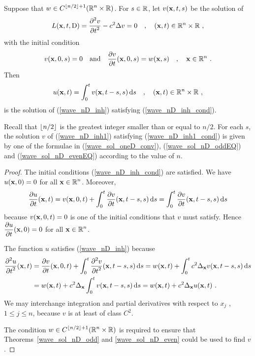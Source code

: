 \begin{theorem}
Suppose that $\displaystyle w\in C^{\lfloor{n/2}\rfloor+1}(\mathbb{R}^n\times \mathbb{R})$.
For $s\in \mathbb{R}$, let $v(\mathbf{x},t,s)$ be the solution of
\begin{equation} \label{wave_nD_inh1}
L(\mathbf{x},t,\operatorname{D}) = \frac{\displaystyle \partial^{2}{v}} {\displaystyle \partial t^{2}} - c^2 \Delta v = 0 \quad ,
\quad (\mathbf{x},t) \in \mathbb{R}^n \times \mathbb{R} \ ,
\end{equation}
with the initial condition
\begin{equation} \label{wave_nD_inh1_cond}
v(\mathbf{x}, 0, s) = 0 \quad \text{and} \quad
\frac{\partial{v}}{\partial t}(\mathbf{x},0,s) = w(\mathbf{x},s) \quad , \quad
\mathbf{x} \in \mathbb{R}^n \ .
\end{equation}
Then
\[
u(\mathbf{x},t) = \int_0^t v(\mathbf{x},t-s,s)\,\mathrm{d}{s} \quad , \quad
(\mathbf{x},t) \in \mathbb{R}^n \times \mathbb{R} \ ,
\]
is the solution of (\ref{wave_nD_inh}) satisfying
(\ref{wave_nD_inh_cond}).
\end{theorem}

\begin{rmk}
Recall that $\lfloor{n/2}\rfloor$ is the greatest integer smaller than
or equal to $n/2$.  For each $s$, the solution $v$ of (\ref{wave_nD_inh1})
satisfying (\ref{wave_nD_inh1_cond}) is given by one of the formulae
in (\ref{wave_sol_oneD_conv}), (\ref{wave_sol_nD_oddEQ}) and
(\ref{wave_sol_nD_evenEQ}) according to the value of $n$.
\end{rmk}

\begin{proof}
The initial conditions (\ref{wave_nD_inh_cond}) are satisfied.  We
have $u(\mathbf{x},0) = 0$ for all $\displaystyle \mathbf{x} \in \mathbb{R}^n$.  Moreover,
\[
\frac{\partial{u}}{\partial t}(\mathbf{x},t) = v(\mathbf{x}, 0, t) +
\int_0^t \frac{\partial{v}}{\partial t}(\mathbf{x}, t-s,s)\,\mathrm{d}{s} =
\int_0^t \frac{\partial{v}}{\partial t}(\mathbf{x}, t-s,s)\,\mathrm{d}{s}
\]
because $v(\mathbf{x},0,t) = 0$ is one of the initial conditions that $v$
must satisfy.  Hence $\displaystyle \frac{\partial{u}}{\partial t}(\mathbf{x},0) = 0$
for all $\displaystyle \mathbf{x} \in \mathbb{R}^n$.

The function $u$ satisfies (\ref{wave_nD_inh}) because
\begin{align*}
\frac{\displaystyle \partial^{2}{u}} {\displaystyle \partial t^{2}}(\mathbf{x},t) &= \frac{\partial{v}}{\partial t}(\mathbf{x}, 0, t)
+ \int_0^t \frac{\displaystyle \partial^{2}{v}} {\displaystyle \partial t^{2}}(\mathbf{x}, t-s, s) \,\mathrm{d}{s}
= w(\mathbf{x},t) + \int_0^t c^2 \Delta_{\mathbf{x}} v(\mathbf{x},t-s,s) \,\mathrm{d}{s} \\
&= w(\mathbf{x},t) + c^2 \Delta_{\mathbf{x}} \int_0^t v(\mathbf{x},t-s,s) \,\mathrm{d}{s}
=  w(\mathbf{x},t) + c^2 \Delta_{\mathbf{x}} u(\mathbf{x},t) \  .
\end{align*}
We may interchange integration and partial derivatives with respect to
$x_j$ , $1\leq j \leq n$, because $v$ is at least of class $\displaystyle C^2$.

The condition $\displaystyle w\in C^{\lfloor{n/2}\rfloor+1}(\mathbb{R}^n\times \mathbb{R})$
is required to ensure that Theorems~\ref{wave_sol_nD_odd}
and \ref{wave_sol_nD_even} could be used to find $v$.
\end{proof}


